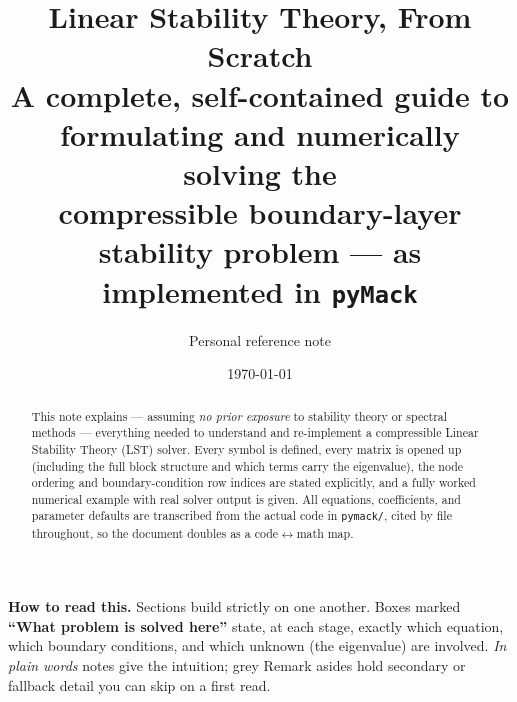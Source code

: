 \documentclass[11pt]{article}
\title{\textbf{Linear Stability Theory, From Scratch}\\[3pt]
\large A complete, self-contained guide to formulating and numerically solving the\\
compressible boundary-layer stability problem --- as implemented in \texttt{pyMack}}
\author{Personal reference note}
\date{\today}
\begin{document}
\maketitle

\begin{abstract}
\noindent This note explains --- assuming \emph{no prior exposure} to stability theory or spectral
methods --- everything needed to understand and re-implement a compressible Linear Stability Theory
(LST) solver. Every symbol is defined, every matrix is opened up (including the full block structure and
which terms carry the eigenvalue), the node ordering and boundary-condition row indices are stated
explicitly, and a fully worked numerical example with real solver output is given. All equations,
coefficients, and parameter defaults are transcribed from the actual code in \texttt{pymack/}, cited by
file throughout, so the document doubles as a code$\leftrightarrow$math map.
\end{abstract}

\tableofcontents
\bigskip

\noindent\textbf{How to read this.} Sections build strictly on one another. Boxes marked
{\color{kicol}\textbf{``What problem is solved here''}} state, at each stage, exactly which equation,
which boundary conditions, and which unknown (the eigenvalue) are involved. \emph{In plain words} notes
give the intuition; grey \textsf{Remark} asides hold secondary or fallback detail you can skip on a first
read.
\end{document}
